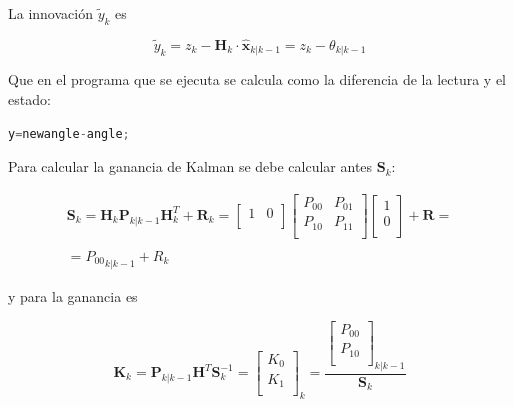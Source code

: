 \documentclass[twoside,11pt]{book}
\begin{document}
La innovación $\tilde{y}_{k}$ es 

\begin{equation}
\tilde{y}_{k}=z_{k} - \mathbf{H}_{k}\cdot \hat{\mathbf{x}}_{k|k-1}=z_{k} - \theta_{k|k-1}
\end{equation}

Que en el programa que se ejecuta se calcula como la diferencia de la lectura y el estado:

\begin{lstlisting}[language=C,firstnumber=7]
y=newangle-angle;
\end{lstlisting}

Para calcular la ganancia de Kalman se debe calcular antes $\mathbf{S}_{k}$: 

\begin{equation}
\begin{array}{c}
\mathbf{S}_{k}=\mathbf{H}_{k} \mathbf{P}_{k|k-1} \mathbf{H}_{k}^{T} + \mathbf{R}_{k} = \left[ \begin{array}{cc}
1 & 0 \\ \end{array} \right] \left[ \begin{array}{cc}
P_{00} & P_{01} \\
P_{10} & P_{11} \\ \end{array} \right] \left[ \begin{array}{c}
1 \\
0 \\ \end{array} \right] + \mathbf{R}= \\
\\
={P_{00}}_{k|k-1} + R_{k}
\end{array}
\end{equation}

y para la ganancia es

\begin{equation}
\mathbf{K}_{k}=\mathbf{P}_{k|k-1}\mathbf{H}^{T}\mathbf{S}_{k}^{-1}= \left[ \begin{array}{c}
K_{0} \\
K_{1} \\ \end{array} \right] _{k} = \frac{\left[ \begin{array}{c}
P_{00} \\
P_{10} \\ \end{array} \right]_{k|k-1}}{\mathbf{S}_{k}}
\end{equation}
\end{document}

